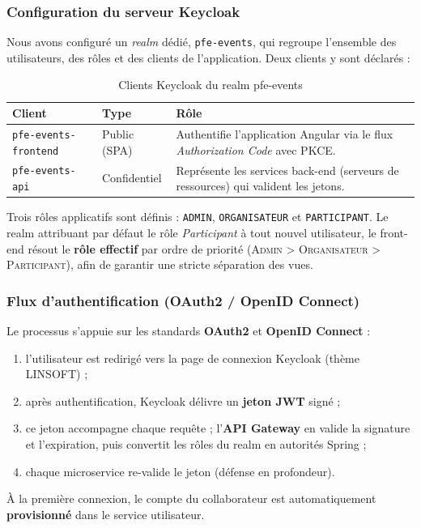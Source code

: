 \subsubsection{Configuration du serveur Keycloak}
Nous avons configuré un \textit{realm} dédié, \texttt{pfe-events}, qui regroupe l'ensemble des
utilisateurs, des rôles et des clients de l'application. Deux clients y sont déclarés :

\begin{table}[H]\centering\renewcommand{\arraystretch}{1.3}
\begin{tabular}{|p{3.8cm}|p{2.6cm}|p{7cm}|}\hline
\rowcolor{gray!15}\textbf{Client} & \textbf{Type} & \textbf{Rôle} \\ \hline
\texttt{pfe-events-frontend} & Public (SPA) & Authentifie l'application Angular via le flux
\textit{Authorization Code} avec PKCE. \\ \hline
\texttt{pfe-events-api} & Confidentiel & Représente les services back-end (serveurs de
ressources) qui valident les jetons. \\ \hline
\end{tabular}
\caption{Clients Keycloak du realm pfe-events}\label{tab:kc-clients}
\end{table}

Trois rôles applicatifs sont définis : \texttt{ADMIN}, \texttt{ORGANISATEUR} et
\texttt{PARTICIPANT}. Le realm attribuant par défaut le rôle \textit{Participant} à tout
nouvel utilisateur, le front-end résout le \textbf{rôle effectif} par ordre de priorité
(\textsc{Admin} > \textsc{Organisateur} > \textsc{Participant}), afin de garantir une stricte
séparation des vues.

\subsubsection{Flux d'authentification (OAuth2 / OpenID Connect)}
Le processus s'appuie sur les standards \textbf{OAuth2} et \textbf{OpenID Connect} :
\begin{enumerate}[leftmargin=1.2cm]
  \item l'utilisateur est redirigé vers la page de connexion Keycloak (thème LINSOFT) ;
  \item après authentification, Keycloak délivre un \textbf{jeton JWT} signé ;
  \item ce jeton accompagne chaque requête ; l'\textbf{API Gateway} en valide la signature et
  l'expiration, puis convertit les rôles du realm en autorités Spring ;
  \item chaque microservice re-valide le jeton (défense en profondeur).
\end{enumerate}
À la première connexion, le compte du collaborateur est automatiquement \textbf{provisionné}
dans le service utilisateur.

